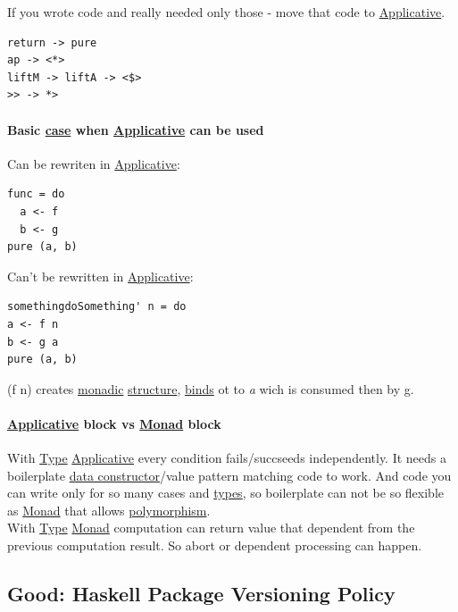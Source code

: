 \documentclass[11pt]{article}
\begin{document}
If you wrote code and really needed only those - move that code to \hyperref[org24a6930]{Applicative}.\\
\begin{verbatim}
return -> pure
ap -> <*>
liftM -> liftA -> <$>
>> -> *>
\end{verbatim}

\paragraph{Basic \hyperref[org96bceb0]{case} when \hyperref[org24a6930]{Applicative} can be used}
\label{sec:org9e4084e}

Can be rewriten in \hyperref[org24a6930]{Applicative}:\\
\begin{verbatim}
func = do
  a <- f
  b <- g
pure (a, b)
\end{verbatim}

Can't be rewritten in \hyperref[org24a6930]{Applicative}:\\
\begin{verbatim}
somethingdoSomething' n = do
a <- f n
b <- g a
pure (a, b)
\end{verbatim}
(f n) creates \hyperref[org5cc37ea]{monadic} \hyperref[org93ee82c]{structure}, \hyperref[org4d3a6be]{binds} ot to \emph{a} wich is consumed then by g.\\

\paragraph{\hyperref[org24a6930]{Applicative} block vs \hyperref[org268aaf1]{Monad} block}
\label{sec:orgaef516a}

With \hyperref[org4fbaeb8]{Type} \hyperref[org24a6930]{Applicative} every condition fails/succseeds independently. It needs a boilerplate \hyperref[org6dad980]{data constructor}/value pattern matching code to work. And code you can write only for so many cases and \hyperref[org3927fd9]{types}, so boilerplate can not be so flexible as \hyperref[org268aaf1]{Monad} that allows \hyperref[org4bdf515]{polymorphism}.\\
With \hyperref[org4fbaeb8]{Type} \hyperref[org268aaf1]{Monad} computation can return value that dependent from the previous computation result. So abort or dependent processing can happen.\\

\subsection{\label{org1079df7}Good: Haskell Package Versioning Policy}
\label{sec:org4cf42e1}
\end{document}

